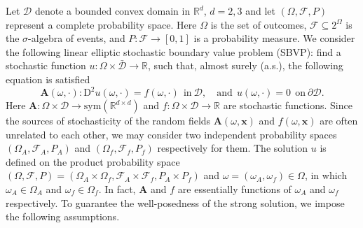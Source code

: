 \documentclass[final,onefignum,onetabnum]{mousaviart}
\begin{document}
	Let $\mathcal{D}$ denote a bounded convex domain in $\mathbb{R}^d$, $d=2,3$ and let $(\Omega, \mathcal{F}, P)$ represent a complete probability space. Here $\Omega$ is the set of outcomes, $\mathcal{F}\subseteq 2^{\Omega}$ is the $\sigma$-algebra of events, and $P:\mathcal{F}\rightarrow [0,1]$ is a probability measure. We consider the following linear elliptic stochastic boundary value problem (SBVP): find a stochastic function $u :  \Omega \times \bar{\mathcal{D}} \rightarrow \mathbb{R} $, 
	such that, almost surely (a.s.), the following equation is satisfied
	\begin{equation}
		\label{eq:nondivergence}
		\boldsymbol{A}(\omega, \cdot): \mathrm{D}^2u(\omega, \cdot) = f(\omega, \cdot) ~~ \mathrm{in}~\mathcal{D},
		\quad \mathrm{and} ~~
		u(\omega, \cdot) =0 ~~ \mathrm{on}~ \partial \mathcal{D}.
	\end{equation}
	Here $\boldsymbol{A}:\Omega \times \mathcal{D}  \rightarrow \text{sym}(\mathbb{R}^{d \times d})$ and $f: \Omega \times \mathcal{D} \rightarrow \mathbb{R}$ are stochastic functions.
	Since the sources of stochasticity of the random fields $\boldsymbol{A}(\omega, \boldsymbol{x})$ and $f(\omega, \boldsymbol{x})$ are often unrelated to each other, we may consider two independent probability spaces $(\Omega_{A}, \mathcal{F}_{A}, P_{A})$ and $(\Omega_f, \mathcal{F}_f, P_f)$ respectively for them. The solution $u$ is defined on the product probability space $ (\Omega, \mathcal{F}, P) = \left( \Omega_{A} \times \Omega_f, \mathcal{F}_{A} \times \mathcal{F}_{f}, P_{A} \times P_{f}  \right) $ and $\omega = (\omega_{A}, \omega_{f}) \in \Omega$, in which $\omega_{A} \in \Omega_{A}$ and $\omega_{f} \in \Omega_{f}$. In fact, $\boldsymbol{A}$ and $f$ are essentially functions of $\omega_{A}$ and $\omega_f$ respectively.
	To guarantee the well-posedness of the strong solution, we impose the following assumptions.
	
\end{document}
